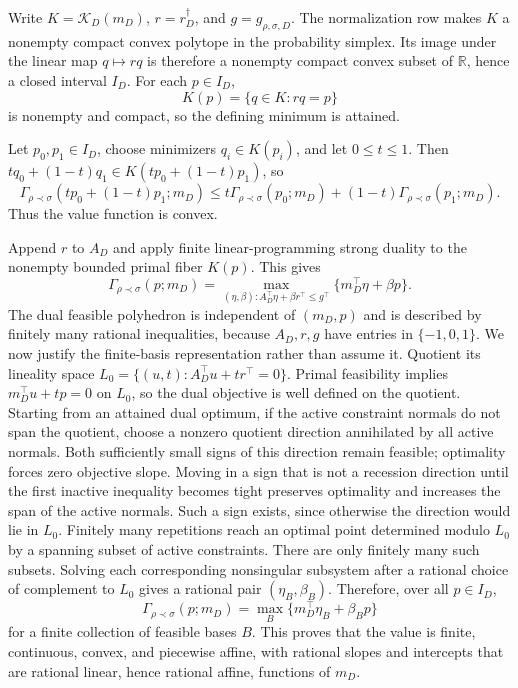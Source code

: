 Write \(K=\mathcal K_D(m_D)\), \(r=r_D^\dagger\), and \(g=g_{\rho,\sigma,D}\).  The normalization row makes \(K\) a nonempty compact convex polytope in the probability simplex.  Its image under the linear map \(q\mapsto rq\) is therefore a nonempty compact convex subset of \(\mathbb R\), hence a closed interval \(I_D\).  For each \(p\in I_D\),
\[
K(p)=\{q\in K:rq=p\}
\]
is nonempty and compact, so the defining minimum is attained.

Let \(p_0,p_1\in I_D\), choose minimizers \(q_i\in K(p_i)\), and let \(0\leq t\leq1\).  Then \(tq_0+(1-t)q_1\in K(tp_0+(1-t)p_1)\), so
\[
\Gamma_{\rho\prec\sigma}(tp_0+(1-t)p_1;m_D)
\leq t\Gamma_{\rho\prec\sigma}(p_0;m_D)
+(1-t)\Gamma_{\rho\prec\sigma}(p_1;m_D).
\]
Thus the value function is convex.

Append \(r\) to \(A_D\) and apply finite linear-programming strong duality to the nonempty bounded primal fiber \(K(p)\).  This gives
\[
\Gamma_{\rho\prec\sigma}(p;m_D)
=\max_{(\eta,\beta):A_D^\top\eta+\beta r^\top\leq g^\top}
\{m_D^\top\eta+\beta p\}.
\]
The dual feasible polyhedron is independent of \((m_D,p)\) and is described by finitely many rational inequalities, because \(A_D,r,g\) have entries in \(\{-1,0,1\}\).  We now justify the finite-basis representation rather than assume it.  Quotient its lineality space \(L_0=\{(u,t):A_D^\top u+t r^\top=0\}\).  Primal feasibility implies \(m_D^\top u+tp=0\) on \(L_0\), so the dual objective is well defined on the quotient.  Starting from an attained dual optimum, if the active constraint normals do not span the quotient, choose a nonzero quotient direction annihilated by all active normals.  Both sufficiently small signs of this direction remain feasible; optimality forces zero objective slope.  Moving in a sign that is not a recession direction until the first inactive inequality becomes tight preserves optimality and increases the span of the active normals.  Such a sign exists, since otherwise the direction would lie in \(L_0\).  Finitely many repetitions reach an optimal point determined modulo \(L_0\) by a spanning subset of active constraints.  There are only finitely many such subsets.  Solving each corresponding nonsingular subsystem after a rational choice of complement to \(L_0\) gives a rational pair \((\eta_B,\beta_B)\).  Therefore, over all \(p\in I_D\),
\[
\Gamma_{\rho\prec\sigma}(p;m_D)
=\max_B\{m_D^\top\eta_B+\beta_Bp\}
\]
for a finite collection of feasible bases \(B\).  This proves that the value is finite, continuous, convex, and piecewise affine, with rational slopes and intercepts that are rational linear, hence rational affine, functions of \(m_D\).

